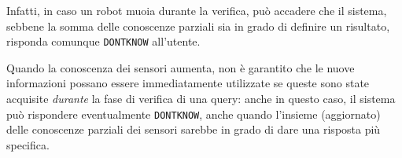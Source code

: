 Infatti,
in caso un robot muoia durante la verifica, può accadere che il sistema,
sebbene la somma delle conoscenze parziali sia in grado di definire
un risultato, risponda comunque \texttt{DONTKNOW} all'utente.

Quando la conoscenza dei sensori aumenta,
non è garantito che le nuove informazioni possano essere immediatamente
utilizzate se queste sono state acquisite \emph{durante} la fase di verifica
di una query: anche in questo caso, il sistema può rispondere eventualmente
\texttt{DONTKNOW}, anche quando l'insieme (aggiornato) delle conoscenze
parziali dei sensori sarebbe in grado di dare una risposta più specifica.


